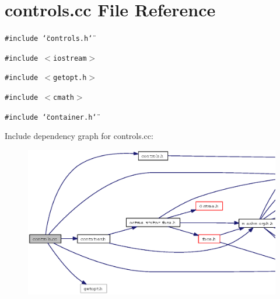 \section{controls.cc File Reference}
\label{controls_8cc}
{\tt \#include \char`\"{}controls.h\char`\"{}}\par
{\tt \#include $<$iostream$>$}\par
{\tt \#include $<$getopt.h$>$}\par
{\tt \#include $<$cmath$>$}\par
{\tt \#include \char`\"{}container.h\char`\"{}}\par


Include dependency graph for controls.cc:\begin{figure}[H]
\begin{center}
\leavevmode
\includegraphics[width=364pt]{controls_8cc__incl}
\end{center}
\end{figure}
